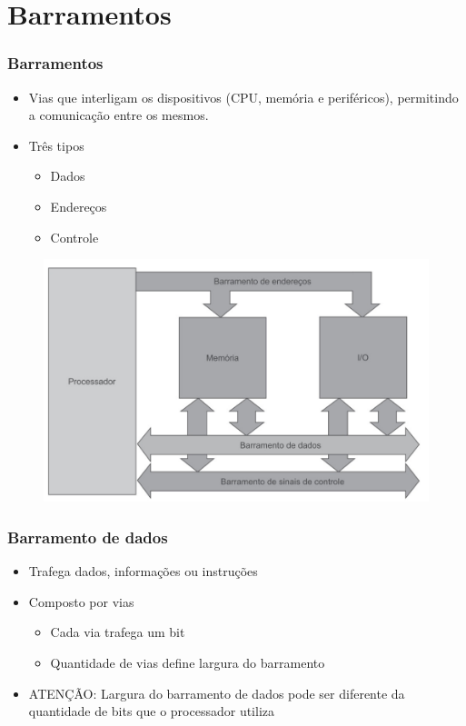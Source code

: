 \documentclass[aspectratio=169,
				xcolor=table]{beamer}
\begin{document}
	\section{Barramentos}	
	
	\begin{frame}
		\frametitle{Barramentos}
		\begin{itemize}
			\item Vias que interligam os dispositivos (CPU, memória e periféricos), permitindo a comunicação entre os mesmos.
			\vspace{1em}
			\item Três tipos
			\begin{itemize}
				\item Dados
				\item Endereços
				\item Controle
			\end{itemize}
		\end{itemize}
		\begin{minipage}{\textwidth}
		
				\vspace*{-3cm}
			\begin{figure}
				\centering
				\hspace*{5cm}
				\includegraphics[width=.65\textwidth, keepaspectratio]{../figs/cap05/barramento.png}
			\end{figure}		
		\end{minipage}
	\end{frame}
	
	\begin{frame}
		\frametitle{Barramento de dados}
		
		\begin{itemize}
			\item Trafega dados, informações ou instruções 
			\vspace{1em}
			\item Composto por vias
			\begin{itemize}
				\item Cada via trafega um bit
				\item Quantidade de vias define largura do barramento

			\end{itemize}
			\vspace{1em}
			
			\item \alert{ATENÇÃO: Largura do barramento de dados pode ser diferente da quantidade de bits que o processador utiliza} 			

		\end{itemize}
	\end{frame}
	
\end{document}
